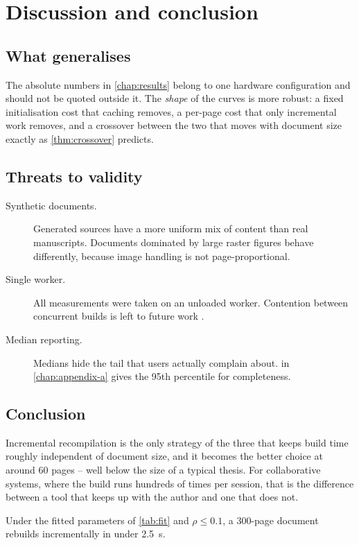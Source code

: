 \chapter{Discussion and conclusion}
\label{chap:conclusion}

\section{What generalises}

The absolute numbers in \cref{chap:results} belong to one hardware
configuration and should not be quoted outside it. The \emph{shape} of
the curves is more robust: a fixed initialisation cost that caching
removes, a per-page cost that only incremental work removes, and a
crossover between the two that moves with document size exactly as
\cref{thm:crossover} predicts.

\section{Threats to validity}

\begin{description}
  \item[Synthetic documents.] Generated sources have a more uniform mix
        of content than real manuscripts. Documents dominated by large
        raster figures behave differently, because image handling is not
        page-proportional.
  \item[Single worker.] All measurements were taken on an unloaded
        worker. Contention between concurrent builds is left to future
        work \autocite{example2026conference}.
  \item[Median reporting.] Medians hide the tail that users actually
        complain about.  in \cref{chap:appendix-a}
        gives the 95th percentile for completeness.
\end{description}

\section{Conclusion}

Incremental recompilation is the only strategy of the three that keeps
build time roughly independent of document size, and it becomes the
better choice at around \num{60} pages -- well below the size of a
typical thesis. For collaborative systems, where the build runs hundreds
of times per session, that is the difference between a tool that keeps
up with the author and one that does not.

\begin{proposition}
Under the fitted parameters of \cref{tab:fit} and $\rho \le 0.1$, a
\num{300}-page document rebuilds incrementally in under \qty{2.5}{\second}.
\end{proposition}
